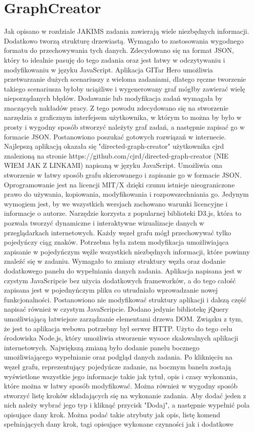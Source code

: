 \documentclass[11pt,a4paper,polish,thesis]{dcsbook}
\begin{document}
	\section{GraphCreator}
	Jak opisano w rozdziale JAKIMS zadania zawierają wiele niezbędnych informacji. Dodatkowo tworzą strukturę drzewiastą. Wymagało to zastosowania wygodnego formatu do przechowywania tych danych. Zdecydowano się na format JSON, który to idealnie pasuję do tego zadania oraz jest łatwy w odczytywaniu i modyfikowaniu w języku JavaScript.
	Aplikacja GITar Hero umożliwia przetwarzanie dużych scenariuszy z wieloma zadaniami, dlatego ręczne tworzenie takiego scenariusza byłoby uciążliwe i wygenerowany graf mógłby zawierać wielę nieporządanych błędów. Dodawanie lub modyfikacja zadań wymagała by znaczących nakładów pracy. Z tego powodu zdecydowano się na stworzenie narzędzia z graficznym interfejsem użytkownika, w którym to można by było w prosty i wygodny sposób stworzyć należyty graf zadań, a następnie zapisać go w formacie JSON. Postanowiono poszukać gotowych rozwiązań w internecie. Najlepszą aplikacją okazała się "directed-graph-creator" użytkownika cjrd znalezioną na stronie https://github.com/cjrd/directed-graph-creator (NIE WIEM JAK Z LINKAMI) napisaną w języku JavaScript. Umożliwia ona stworzenie w łatwy sposób grafu skierowanego i zapisanie go w formacie JSON. Oprogramowanie jest na licencji MIT/X dzięki czumu istnieje nieograniczone prawo do używania, kopiowania, modyfikowania i rozpowszechniania go. Jedynym wymogiem jest, by we wszystkich wersjach zachowano warunki licencyjne i informacje o autorze. Narzędzie korzysta z popularnej biblioteki D3.js, która to pozwala tworzyć dynamiczne i interaktywne wizualizacje danych w przeglądarkach internetowych. Każdy węzeł grafu mógł przechowywać tylko pojedyńczy ciąg znaków. Potrzebna była zatem modyfikacja umożliwiająca zapisanie w pojedyńczym węźle wszystkich niezbędnych informacji, które powinny znaleźć się w zadaniu. Wymagało to zmiany struktury węzła oraz dodanie dodatkowego panelu do wypełniania danych zadania. Aplikacja napisana jest w czystym JavaScripcie bez użycia dodatkowych frameworków, a do tego całość zapisana jest w pojednyńczym pliku co utrudniało wprowadzanie nowej funkcjonalności. Postanowiono nie modyfikować struktury aplikacji i dalszą część napisać również w czystym JavaScripcie. Dodano jedynie bibliotekę jQuery umożliwiającą łatwiejsze zarządzanie elementami drzewa DOM. Związku z tym, że jest to aplikacja webowa potrzebny był serwer HTTP. Użyto do tego celu środowiska Node.js, który umożliwia stworzenie wysoce skalowalnych aplikacji internetowych. Największą zmianą było dodanie panelu bocznego umożliwiającego wypełnianie oraz podgląd danych zadania. Po kliknięciu na węzeł grafu, reprezentujący pojedyńcze zadanie, na bocznym banelu zostają wyświetlone wszystkie jego informacje takie jak tytuł, opis i czasy wykonania, które można w łatwy sposób modyfikować. Można również w wygodny sposób stworzyć listę kroków składających się na wykonanie zadania. Aby dodać jeden z nich należy wybrać jego typ i kliknąć przycisk "Dodaj", a następnie wypełnić pola opisujące dany krok. Można podać takie atrybuty jak opis, listę komend spełniających dany krok, tagi opisujące wykonane czynności jak i dodatkowe 
\end{document}
